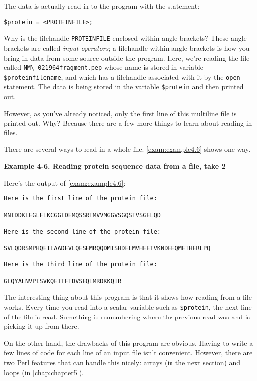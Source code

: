 The data is actually read in to the program with the statement:

\begin{lstlisting}
$protein = <PROTEINFILE>;
\end{lstlisting}

Why is the filehandle \verb|PROTEINFILE| enclosed within angle brackets?  These angle brackets are called \textit{input operators}; a filehandle within angle brackets is how you bring in data from some source outside the program. Here, we're reading the file called \verb|NM\_021964fragment.pep| whose name is stored in variable \verb|$proteinfilename|, and which has a filehandle associated with it by the \verb|open| statement. The data is being stored in the variable \verb|$protein| and then printed out.

However, as you've already noticed, only the first line of this multiline file is printed out. Why? Because there are a few more things to learn about reading in files.

There are several ways to read in a whole file. \autoref{exam:example4.6} shows one way.

\textbf{Example 4-6. Reading protein sequence data from a file, take 2}



Here's the output of \autoref{exam:example4.6}:

\begin{lstlisting}
Here is the first line of the protein file:

MNIDDKLEGLFLKCGGIDEMQSSRTMVVMGGVSGQSTVSGELQD

Here is the second line of the protein file:

SVLQDRSMPHQEILAADEVLQESEMRQQDMISHDELMVHEETVKNDEEQMETHERLPQ

Here is the third line of the protein file:

GLQYALNVPISVKQEITFTDVSEQLMRDKKQIR
\end{lstlisting}

The interesting thing about this program is that it shows how reading from a file works. Every time you read into a scalar variable such as \verb|$protein|, the next line of the file is read. Something is remembering where the previous read was and is picking it up from there.

On the other hand, the drawbacks of this program are obvious. Having to write a few lines of code for each line of an input file isn't convenient. However, there are two Perl features that can handle this nicely: arrays (in the next section) and loops (in \autoref{chap:chapter5}). 

